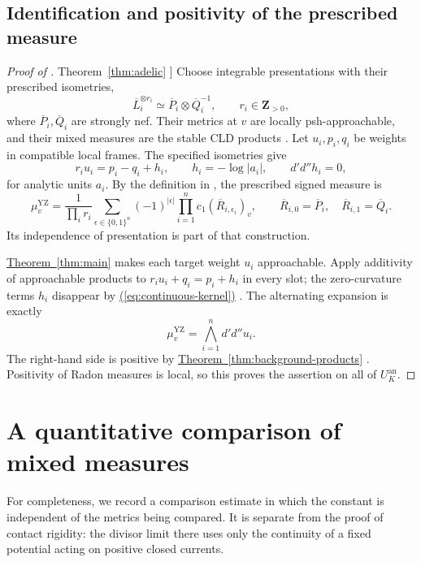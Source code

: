 \documentclass[11pt]{amsart}
\theoremstyle{definition}
\theoremstyle{remark}
\numberwithin{equation}{section}
\newcommand{\ddc}{d'd''}
\newcommand{\an}{\mathrm{an}}
\newcommand{\Z}{\mathbf Z}
\newcommand{\namedref}[2]{%
 \begingroup
 \ifstrequal{#1}{Section}{\hypersetup{linkcolor=sectionteal}}{%
  \ifstrequal{#1}{Appendix}{\hypersetup{linkcolor=sectionteal}}{}}%
 \hyperref[#2]{#1~\ref*{#2}}%
 \endgroup}
\renewcommand{\eqref}[1]{%
 \begingroup\hypersetup{linkcolor=equationviolet}%
 \hyperref[#1]{\textup{(\ref*{#1})}}%
 \endgroup}
\begin{document}
\subsection{Identification and positivity of the prescribed measure}
\label{subsec:adelic-proof}
\begin{proof}[Proof of \namedref{Theorem}{thm:adelic}]
Choose integrable presentations with their prescribed isometries,
\[
 \overline L_i^{\otimes r_i}
 \simeq\overline P_i\otimes\overline Q_i^{-1},
 \qquad r_i\in\Z_{>0},
\]
where \(\overline P_i,\overline Q_i\) are strongly nef. Their metrics
at \(v\) are locally psh-approachable, and their mixed measures are
the stable CLD products
\cite[Lemma 3.6.7 and Sections 3.6.7--3.6.8]{YZ}.
Let \(u_i,p_i,q_i\) be weights in compatible local frames. The
specified isometries give
\[
 r_i u_i=p_i-q_i+h_i,\qquad
 h_i=-\log|a_i|,\qquad \ddc h_i=0,
\]
for analytic units \(a_i\). By the definition in
\cite[Section 3.6.8]{YZ}, the prescribed signed measure is
\begin{equation}\label{eq:adelic-expansion}
 \mu_v^{\mathrm{YZ}}
 =\frac1{\prod_i r_i}
   \sum_{\epsilon\in\{0,1\}^n}(-1)^{|\epsilon|}
       \prod_{i=1}^n c_1(\overline R_{i,\epsilon_i})_v,
 \qquad
 \overline R_{i,0}=\overline P_i,\quad
 \overline R_{i,1}=\overline Q_i.
\end{equation}
Its independence of presentation is part of that construction.

\namedref{Theorem}{thm:main} makes each target weight \(u_i\) approachable.
Apply additivity of approachable products to
\(r_i u_i+q_i=p_i+h_i\) in every slot; the zero-curvature terms
\(h_i\) disappear by \eqref{eq:continuous-kernel}.
The alternating expansion is exactly
\begin{equation}\label{eq:adelic-local}
 \mu_v^{\mathrm{YZ}}=\bigwedge_{i=1}^n\ddc u_i.
\end{equation}
The right-hand side is positive by
\namedref{Theorem}{thm:background-products}. Positivity of Radon measures
is local, so this proves the assertion on all of \(U_K^\an\).
\end{proof}

\appendix
\section{A quantitative comparison of mixed measures}
\label{app:comparison}

For completeness, we record a comparison estimate in which the constant
is independent of the metrics being compared. It is separate from the
proof of contact rigidity: the divisor limit there uses only the
continuity of a fixed potential acting on positive closed currents.
\end{document}
